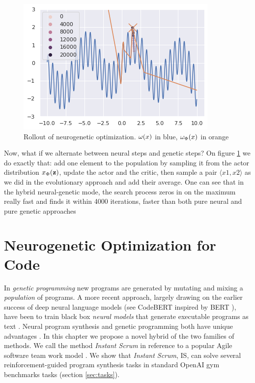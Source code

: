     
\begin{figure}
    \centering
    \includegraphics[width=0.8\linewidth]{images/neuropt4.png}
    \caption{Rollout of neurogenetic optimization. $ \omega(x) $ in blue, $ \omega_{\Phi}(x) $ in orange}
    \label{fig:neuropt-combined}
\end{figure}

Now, what if we alternate between neural steps and genetic steps?
On figure \ref{fig:neuropt-combined} we do exactly that: add one element to the population by sampling it from the actor distribution $ x_{\Phi}(\mathbf{z}) $, update the actor and the critic, then sample a pair $\langle x1,x2 \rangle$ as we did in the evolutionary approach and add their average.
One can see that in the hybrid neural-genetic mode, the search process zeros in on the maximum really fast and finds it within 4000 iterations, faster than both pure neural and pure genetic approaches 

\newpage
\section{Neurogenetic Optimization for Code}

In \emph{genetic programming} \cite{genprog1,genprog2} new programs are generated by mutating and mixing a \emph{population} of programs. 
 A more recent approach, largely drawing on the earlier success of deep neural language models (see CodeBERT \cite{codebert} inspired by BERT \cite{devlinBERTPretrainingDeep2019}), have been to train black box \emph{neural models} that generate executable programs as text \cite{abolafiaNeuralProgramSynthesis2018,deepcoder,structural}. 
 Neural program synthesis and genetic programming both have unique advantages \cite{geneticvsneural}. 
 In this chapter we propose a novel hybrid of the two families of methods. We call the method \emph{Instant Scrum} in reference to a popular Agile software team work model \cite{scrum}. We show that \emph{Instant Scrum}, IS, can solve several reinforcement-guided program synthesis tasks in standard OpenAI gym benchmarks tasks (section \ref{sec:tasks}). 

